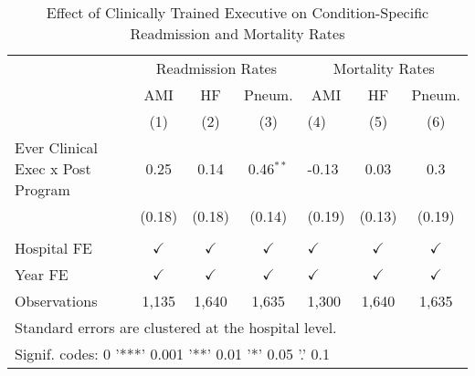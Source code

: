 \begin{table}[ht!]

\caption{\label{tab:results_by_condition}Effect of Clinically Trained Executive on Condition-Specific Readmission and Mortality Rates}
\centering
\begin{tabular}[t]{lccclcc}
\toprule
\multicolumn{1}{c}{ } & \multicolumn{3}{c}{Readmission Rates} & \multicolumn{3}{c}{Mortality Rates} \\
\multicolumn{1}{c}{ } & \multicolumn{1}{c}{AMI} & \multicolumn{1}{c}{HF} & \multicolumn{1}{c}{Pneum.} & \multicolumn{1}{c}{AMI} & \multicolumn{1}{c}{HF} & \multicolumn{1}{c}{Pneum.} \\
\cmidrule(l{3pt}r{3pt}){2-2} \cmidrule(l{3pt}r{3pt}){3-3} \cmidrule(l{3pt}r{3pt}){4-4} \cmidrule(l{3pt}r{3pt}){5-5} \cmidrule(l{3pt}r{3pt}){6-6} \cmidrule(l{3pt}r{3pt}){7-7}
 & (1) & (2) & (3) & (4) & (5) & (6)\\
\midrule
Ever Clinical Exec x Post Program & 0.25 & 0.14 & 0.46$^{**}$ & -0.13 & 0.03 & 0.3\\
 & (0.18) & (0.18) & (0.14) & (0.19) & (0.13) & (0.19)\\
 &  &  &  &  &  & \\
Hospital FE & $\checkmark$ & $\checkmark$ & $\checkmark$ & $\checkmark$ & $\checkmark$ & $\checkmark$\\
Year FE & $\checkmark$ & $\checkmark$ & $\checkmark$ & $\checkmark$ & $\checkmark$ & $\checkmark$\\
\addlinespace
Observations & 1,135 & 1,640 & 1,635 & 1,300 & 1,640 & 1,635\\
\bottomrule
\multicolumn{7}{l}{\textsuperscript{} Standard errors are clustered at the hospital level.}\\
\multicolumn{7}{l}{\textsuperscript{} Signif. codes: 0 '***' 0.001 '**' 0.01 '*' 0.05 '.' 0.1}\\
\end{tabular}
\end{table}
